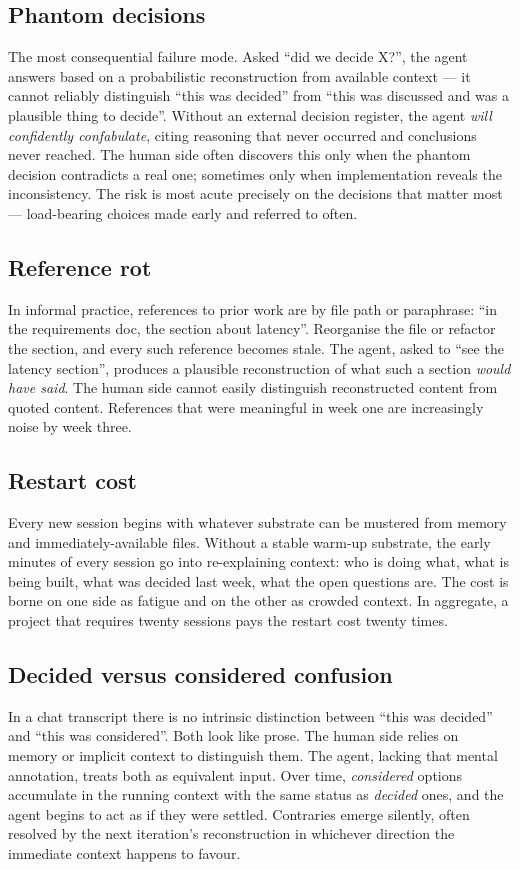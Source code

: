 \documentclass[11pt,a4paper,twocolumn]{article}
\begin{document}
\subsection{Phantom decisions}
The most consequential failure mode. Asked ``did we decide X?'',
the agent answers based on a probabilistic reconstruction from
available context --- it cannot reliably distinguish ``this was
decided'' from ``this was discussed and was a plausible thing to
decide''. Without an external decision register, the agent
\emph{will confidently confabulate}, citing reasoning that never
occurred and conclusions never reached. The human side often
discovers this only when the phantom decision contradicts a real
one; sometimes only when implementation reveals the inconsistency.
The risk is most acute precisely on the decisions that matter most
--- load-bearing choices made early and referred to often.

\subsection{Reference rot}
In informal practice, references to prior work are by file path or
paraphrase: ``in the requirements doc, the section about latency''.
Reorganise the file or refactor the section, and every such
reference becomes stale. The agent, asked to ``see the latency
section'', produces a plausible reconstruction of what such a
section \emph{would have said}. The human side cannot easily
distinguish reconstructed content from quoted content. References
that were meaningful in week one are increasingly noise by week
three.

\subsection{Restart cost}
Every new session begins with whatever substrate can be mustered
from memory and immediately-available files. Without a stable
warm-up substrate, the early minutes of every session go into
re-explaining context: who is doing what, what is being built,
what was decided last week, what the open questions are. The cost
is borne on one side as fatigue and on the other as crowded
context. In aggregate, a project that requires twenty sessions
pays the restart cost twenty times.

\subsection{Decided versus considered confusion}
In a chat transcript there is no intrinsic distinction between
``this was decided'' and ``this was considered''. Both look like
prose. The human side relies on memory or implicit context to
distinguish them. The agent, lacking that mental annotation, treats
both as equivalent input. Over time, \emph{considered} options
accumulate in the running context with the same status as
\emph{decided} ones, and the agent begins to act as if they were
settled. Contraries emerge silently, often resolved by the next
iteration's reconstruction in whichever direction the immediate
context happens to favour.
\end{document}
